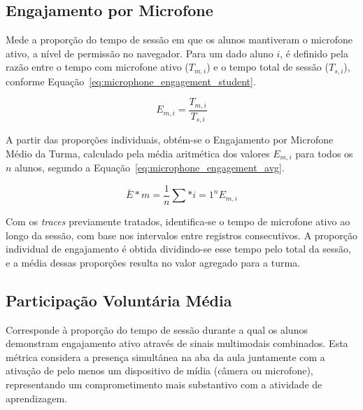 \subsection{Engajamento por Microfone}
Mede a proporção do tempo de sessão em que os alunos mantiveram o microfone ativo, a nível de permissão no navegador. Para um dado aluno $i$, é definido pela razão entre o tempo com microfone ativo ($T_{m,i}$) e o tempo total de sessão ($T_{s,i}$), conforme Equação~\ref{eq:microphone_engagement_student}.

\begin{equation}\label{eq:microphone_engagement_student}
E_{m,i} = \frac{T_{m,i}}{T_{s,i}}
\end{equation}

A partir das proporções individuais, obtém-se o Engajamento por Microfone Médio da Turma, calculado pela média aritmética dos valores $E_{m,i}$ para todos os $n$ alunos, segundo a Equação~\ref{eq:microphone_engagement_avg}.

% 

\begin{equation}\label{eq:microphone_engagement_avg}
\bar{E}*m = \frac{1}{n} \sum*{i=1}^{n} E_{m,i}
\end{equation}

Com os \textit{traces} previamente tratados, identifica-se o tempo de microfone ativo ao longo da sessão, com base nos intervalos entre registros consecutivos. A proporção individual de engajamento é obtida dividindo-se esse tempo pelo total da sessão, e a média dessas proporções resulta no valor agregado para a turma.


\subsection{Participação Voluntária Média}
Corresponde à proporção do tempo de sessão durante a qual os alunos demonstram engajamento ativo através de sinais multimodais combinados. Esta métrica considera a presença simultânea na aba da aula juntamente com a ativação de pelo menos um dispositivo de mídia (câmera ou microfone), representando um comprometimento mais substantivo com a atividade de aprendizagem.

